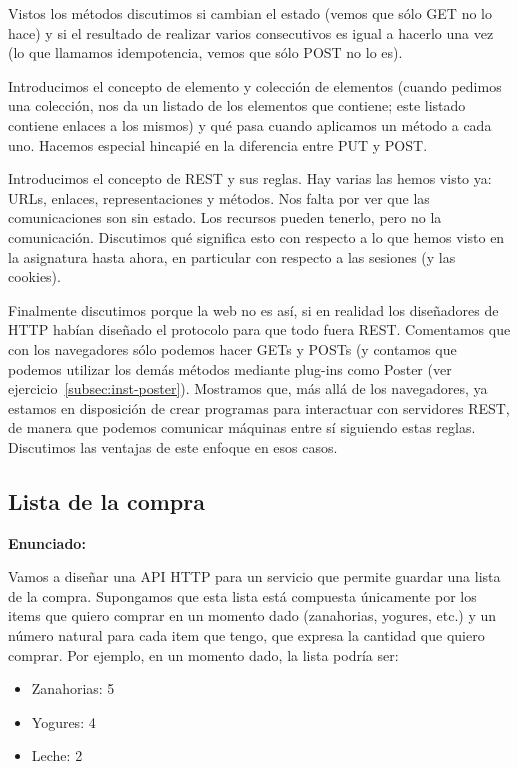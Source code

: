 Vistos los métodos discutimos si cambian el estado (vemos que sólo GET no lo hace) y si el resultado de realizar varios consecutivos es igual a hacerlo una vez (lo que llamamos idempotencia, vemos que sólo POST no lo es).

Introducimos el concepto de elemento y colección de elementos (cuando pedimos una colección, nos da un listado de los elementos que contiene; este listado contiene enlaces a los mismos) y qué pasa cuando aplicamos un método a cada uno. Hacemos especial hincapié en la diferencia entre PUT y POST.

Introducimos el concepto de REST y sus reglas. Hay varias las hemos visto ya: URLs, enlaces, representaciones y métodos. Nos falta por ver que las comunicaciones son sin estado. Los recursos pueden tenerlo, pero no la comunicación. Discutimos qué significa esto con respecto a lo que hemos visto en la asignatura hasta ahora, en particular con respecto a las sesiones (y las cookies).

Finalmente discutimos porque la web no es así, si en realidad los diseñadores de HTTP habían diseñado el protocolo para que todo fuera REST. Comentamos que con los navegadores sólo podemos hacer GETs y POSTs (y contamos que podemos utilizar los demás métodos mediante plug-ins como Poster (ver ejercicio~\ref{subsec:inst-poster}). Mostramos que, más allá de los navegadores, ya estamos en disposición de crear programas para interactuar con servidores REST, de manera que podemos comunicar máquinas entre sí siguiendo estas reglas. Discutimos las ventajas de este enfoque en esos casos.


\subsection{Lista de la compra}
\label{subsec:lista-compra}

\textbf{Enunciado:}

Vamos a diseñar una API HTTP para un servicio que permite guardar una lista de la compra. Supongamos que esta lista está compuesta únicamente por los items que quiero comprar en un momento dado (zanahorias, yogures, etc.) y un número natural para cada item que tengo, que expresa la cantidad que quiero comprar. Por ejemplo, en un momento dado, la lista podría ser:

\begin{itemize}
\item Zanahorias: 5
\item Yogures: 4
\item Leche: 2
\end{itemize}


